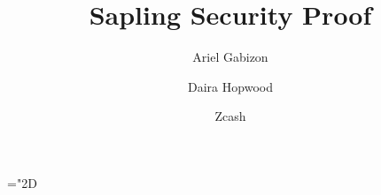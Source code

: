 \documentclass[11pt]{article}
\title{%
Sapling Security Proof}
\author{Ariel Gabizon \and Daira Hopwood}
\date{Zcash}
\numberwithin{equation}{section} %
\numberwithin{figure}{section} %
\newcommand{\set}[1]{\ensuremath{\left\{#1\right\}}\xspace}
\begin{document}
\maketitle
 \mathchardef\mhyphen="2D

\newcommand{\grouppair}{\ensuremath{G^*}\xspace}

\newcommand{\Gt}{\ensuremath{{\mathbb G}_t}\xspace}
\newcommand{\F}{\ensuremath{{\mathbb F}_r}\xspace}
\newcommand{\help}[1]{$#1$-helper\xspace}
\newcommand{\randompair}[1]{\ensuremath{\mathsf{randomPair}(#1)}\xspace}
\newcommand{\pair}[1]{$#1$-pair\xspace}
\newcommand{\pairs}[1]{$#1$-pairs\xspace}
\newcommand{\pubvalsOf}[1]{\ensuremath{\mathrm{pub}(#1)}\xspace}
\newcommand{\pairone}[1]{\G1-$#1$-pair\xspace}
\newcommand{\pairtwo}[1]{\G2-$#1$-pair\xspace}
\newcommand{\sameratio}[2]{\ensuremath{\mathsf{SameRatio}(#1,#2)}\xspace}
\newcommand{\vecc}[2]{\ensuremath{(#1)_{#2}}\xspace}
\newcommand{\players}{\ensuremath{[n]}\xspace}
\newcommand{\ci}{\ensuremath{\mathrm{CI}}\xspace}
\newcommand{\pairvec}[1]{$#1$-vector\xspace}
\newcommand{\Fq}{\ensuremath{\mathbb{F}_q}\xspace}
\newcommand{\sigscheme}{\ensuremath{\mathscr S}\xspace}

\newcommand{\randpair}[1]{\ensuremath{\mathsf{rp}_{#1}}\xspace}
\newcommand{\randpairone}[1]{\ensuremath{\mathsf{rp}_{#1}^{1}}\xspace}

\newcommand{\randpairtwo}[1]{\ensuremath{\mathsf{rp_{#1}^2}}\xspace}%

\newcommand{\pos}{\ensuremath{\mathsf{pos}}\xspace}
\newcommand{\rej}{\ensuremath{\mathsf{rej}}\xspace}
\newcommand{\acc}{\ensuremath{\mathsf{acc}}\xspace}
\newcommand{\sha}[1]{\ensuremath{\mathsf{COMMIT}(#1)}\xspace}
 \newcommand{\shaa}{\ensuremath{\mathsf{COMMIT}}\xspace}
 \newcommand{\comm}[1]{\ensuremath{\mathsf{comm}_{#1}}\xspace}
 \newcommand{\defeq}{:=}

\newcommand{\inpwitness}{\ensuremath{\mathsf{inpwit}}\xspace}
\newcommand{\inpnote}{\ensuremath{\mathsf{inpnote}}\xspace}
\newcommand{\posnote}{\ensuremath{\mathsf{posnote}}\xspace}
\newcommand{\inpnotes}{\ensuremath{{\mathcal{I}}}\xspace}
\newcommand{\outnotes}{\ensuremath{{\mathcal{O}}}\xspace}
\newcommand{\outwitness}{\ensuremath{\mathsf{outwit}}\xspace}
\newcommand{\outnote}{\ensuremath{\mathsf{outnote}}\xspace}
\newcommand{\treehash}{\ensuremath{\mathsf{treehash}}\xspace}
\newcommand{\A}{\ensuremath{\vec{A}}\xspace}
\newcommand{\B}{\ensuremath{\vec{B}}\xspace}
\newcommand{\C}{\ensuremath{\vec{C}}\xspace}
\newcommand{\Btwo}{\ensuremath{\vec{B_2}}\xspace}
\newcommand{\treevecsimp}{\ensuremath{(\tau,\rho_A,\rho_A \rho_B,\rho_A\alpha_A,\rho_A\rho_B\alpha_B, \rho_A\rho_B\alpha_C,\beta,\beta\gamma)}\xspace}%
\newcommand{\rcptc}{random-coefficient subprotocol\xspace}
\newcommand{\rcptcparams}[2]{\ensuremath{\mathrm{RCPC}(#1,#2)}\xspace}
\newcommand{\verifyrcptcparams}[2]{\ensuremath{\mathrm{\mathsf{verify}RCPC}(#1,#2)}\xspace}
\end{document}
